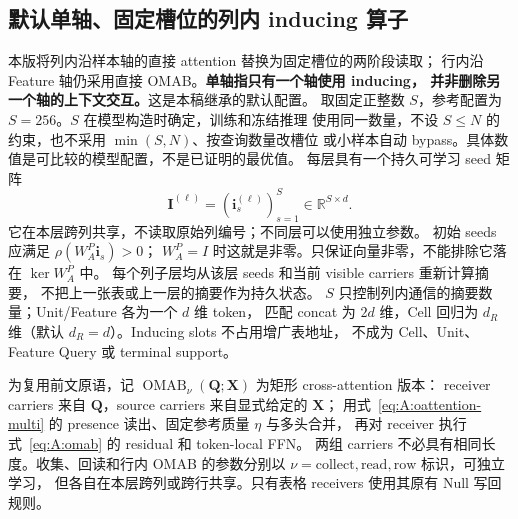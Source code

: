 \documentclass[11pt,UTF8,fontset=fandol]{ctexart}
\numberwithin{equation}{section}
\theoremstyle{definition}
\newcommand{\R}{\mathbb R}
\newcommand{\OMAB}{\operatorname{OMAB}}
\begin{document}

\subsection{默认单轴、固定槽位的列内 inducing 算子}
\label{subsec:A:inducing}

本版将列内沿样本轴的直接 attention 替换为固定槽位的两阶段读取；
行内沿 Feature 轴仍采用直接 OMAB。\textbf{单轴指只有一个轴使用 inducing，
并非删除另一个轴的上下文交互。}这是本稿继承的默认配置。
取固定正整数 $S$，参考配置为 $S=256$。$S$ 在模型构造时确定，训练和冻结推理
使用同一数量，不设 $S\leq N$ 的约束，也不采用 $\min(S,N)$、按查询数量改槽位
或小样本自动 bypass。具体数值是可比较的模型配置，不是已证明的最优值。
每层具有一个持久可学习 seed 矩阵
\begin{equation}
 \bm I^{(\ell)}=(\bm i_s^{(\ell)})_{s=1}^S\in\R^{S\times d}.
 \label{eq:A:inducing-seeds}
\end{equation}
它在本层跨列共享，不读取原始列编号；不同层可以使用独立参数。
初始 seeds 应满足 $\rho(W_A^{P}\bm i_s)>0$；
$W_A^{P}=I$ 时这就是非零。只保证向量非零，不能排除它落在 $\ker W_A^{P}$ 中。
每个列子层均从该层 seeds 和当前 visible carriers 重新计算摘要，
不把上一张表或上一层的摘要作为持久状态。
$S$ 只控制列内通信的摘要数量；Unit/Feature 各为一个 $d$ 维 token，
匹配 concat 为 $2d$ 维，Cell 回归为 $d_R$ 维（默认 $d_R=d$）。Inducing slots 不占用增广表地址，
不成为 Cell、Unit、Feature Query 或 terminal support。

为复用前文原语，记 $\OMAB_\nu(\bm Q;\bm X)$ 为矩形 cross-attention 版本：
receiver carriers 来自 $\bm Q$，source carriers 来自显式给定的 $\bm X$；
用式~\eqref{eq:A:oattention-multi} 的 presence 读出、固定参考质量 $\eta$ 与多头合并，
再对 receiver 执行式~\eqref{eq:A:omab} 的 residual 和 token-local FFN。
两组 carriers 不必具有相同长度。收集、回读和行内 OMAB 的参数分别以
$\nu=\mathrm{collect},\mathrm{read},\mathrm{row}$ 标识，可独立学习，
但各自在本层跨列或跨行共享。只有表格 receivers 使用其原有 Null 写回规则。
\end{document}
